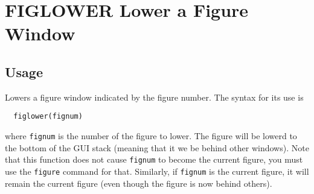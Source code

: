 \section{FIGLOWER Lower a Figure Window}

\subsection{Usage}

Lowers a figure window indicated by the figure number.  The syntax for
its use is
\begin{verbatim}
  figlower(fignum)
\end{verbatim}
where \verb|fignum| is the number of the figure to lower.  The figure will
be lowerd to the bottom of the GUI stack (meaning that it we be behind other
windows).  Note that this function does not cause \verb|fignum| to 
become the current  figure, you must use the \verb|figure| command for that.
Similarly, if \verb|fignum| is the current figure, it will remain the current
figure (even though the figure is now behind others).
